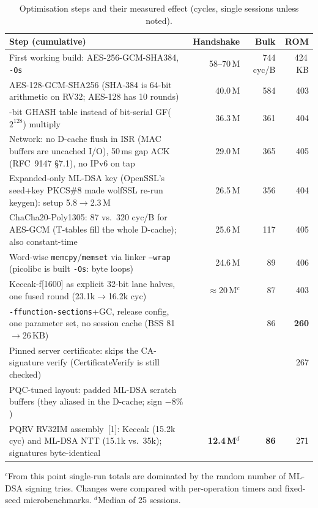 \documentclass[10pt,a4paper]{article}
\newcommand{\M}{\,M}
\begin{document}
\begin{table}[h]
\centering\small
\begin{tabularx}{\textwidth}{@{}>{\raggedright\arraybackslash}Xrrr@{}}
\toprule
Step (cumulative) & Handshake & Bulk & ROM \\
\midrule
First working build: AES-256-GCM-SHA384, \texttt{-Os} & 58--70\M & 744 cyc/B & 424\,KB \\
AES-128-GCM-SHA256 (SHA-384 is 64-bit arithmetic on RV32; AES-128 has 10 rounds) & 40.0\M & 584 & 403 \\
4-bit GHASH table instead of bit-serial GF($2^{128}$) multiply & 36.3\M & 361 & 404 \\
Network: no D-cache flush in ISR (MAC buffers are uncached I/O), 50\,ms gap ACK (RFC~9147 \S7.1), no IPv6 on tap & 29.0\M & 365 & 405 \\
Expanded-only ML-DSA key (OpenSSL's seed+key PKCS\#8 made wolfSSL re-run keygen): setup 5.8$\to$2.3\M & 26.5\M & 356 & 404 \\
ChaCha20-Poly1305: 87 vs.\ 320 cyc/B for AES-GCM (T-tables fill the whole D-cache); also constant-time & 25.6\M & 117 & 405 \\
Word-wise \texttt{memcpy}/\texttt{memset} via linker \texttt{--wrap} (picolibc is built \texttt{-Os}: byte loops) & 24.6\M & 89 & 406 \\
Keccak-f[1600] as explicit 32-bit lane halves, one fused round (23.1k$\to$16.2k cyc) & $\approx$20\M$^{c}$ & 87 & 403 \\
\texttt{-ffunction-sections}+GC, release config, one parameter set, no session cache (BSS 81$\to$26\,KB) & & 86 & \textbf{260} \\
Pinned server certificate: skips the CA-signature verify (CertificateVerify is still checked) & & & 267 \\
PQC-tuned layout: padded ML-DSA scratch buffers (they aliased in the D-cache; sign $-8\%$) & & & \\
PQRV RV32IM assembly~[1]: Keccak (15.2k cyc) and ML-DSA NTT (15.1k vs.\ 35k); signatures byte-identical & \textbf{12.4\M}$^{d}$ & \textbf{86} & 271 \\
\bottomrule
\end{tabularx}

\vspace{2pt}
\footnotesize $^{c}$From this point single-run totals are dominated by the random number of ML-DSA signing tries. Changes were compared with per-operation timers and fixed-seed microbenchmarks.
$^{d}$Median of 25 sessions.
\caption{Optimisation steps and their measured effect (cycles, single sessions unless noted).}
\end{table}
\end{document}
